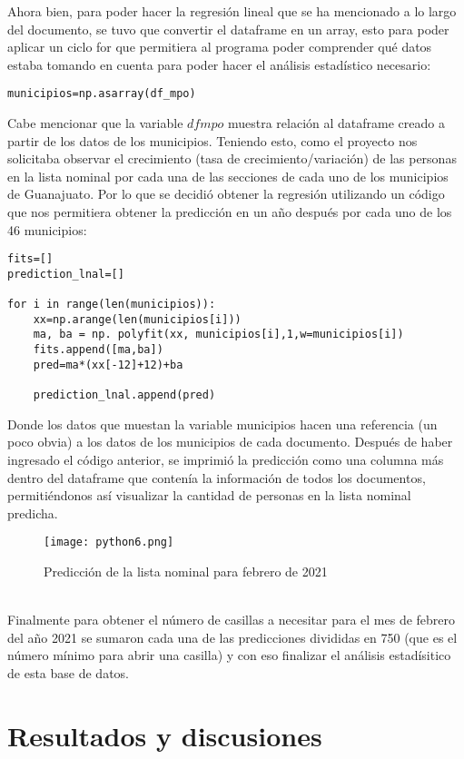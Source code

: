 \documentclass{article}
\begin{document}
Ahora bien, para poder hacer la regresión lineal que se ha mencionado a lo largo del documento, se tuvo que convertir el dataframe en un array, esto para poder aplicar un ciclo for que permitiera al programa poder comprender qué datos estaba tomando en cuenta para poder hacer el análisis estadístico necesario: 
\begin{lstlisting}
municipios=np.asarray(df_mpo)
\end{lstlisting}

\noindent Cabe mencionar que la variable $df mpo$ muestra relación al dataframe creado a partir de los datos de los municipios. Teniendo esto, como el proyecto nos solicitaba observar el crecimiento (tasa de crecimiento/variación) de las personas en la lista nominal por cada una de las secciones de cada uno de los municipios de Guanajuato. Por lo que se decidió obtener la regresión utilizando un código que nos permitiera obtener la predicción en un año después por cada uno de los 46 municipios:
\begin{lstlisting}
fits=[]
prediction_lnal=[]

for i in range(len(municipios)):
    xx=np.arange(len(municipios[i]))
    ma, ba = np. polyfit(xx, municipios[i],1,w=municipios[i])
    fits.append([ma,ba])
    pred=ma*(xx[-12]+12)+ba
  
    prediction_lnal.append(pred)
\end{lstlisting}
Donde los datos que muestan la variable municipios hacen una referencia (un poco obvia) a los datos de los municipios de cada documento.
Después de haber ingresado el código anterior, se imprimió la predicción como una columna más dentro del dataframe que contenía la información de todos los documentos, permitiéndonos así visualizar la cantidad de personas en la lista nominal predicha. 
\begin{figure}[h]
    \centering
    \texttt{[image: python6.png]}
    \caption{Predicción de la lista nominal para febrero de 2021}
    \label{fig:my_label}
\end{figure}\\


\noindent Finalmente para obtener el número de casillas a necesitar para el mes de febrero del año 2021 se sumaron cada una de las predicciones divididas en 750 (que es el número mínimo para abrir una casilla) y con eso finalizar el análisis estadísitico de esta base de datos.




\section{Resultados y discusiones}
\end{document}
